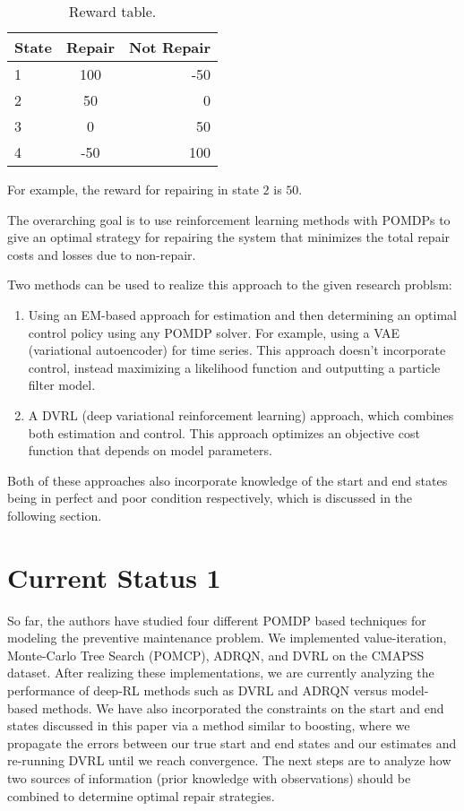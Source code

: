 \documentclass[english]{article}
\numberwithin{equation}{section}
\begin{document}
	 \begin{table}[h!]
	 	\begin{center}
	 		\caption{Reward table.}
	 		\label{tab:table1}
	 		\begin{tabular}{l|c|r} %
	 			\textbf{State} & \textbf{Repair} & \textbf{Not Repair}\\
	 			\hline
	 			1 & 100 & -50\\
	 			2 & 50 & 0\\
	 			3 & 0 & 50\\
	 			4 & -50 & 100
	 		\end{tabular}
	 	\end{center}
	 \end{table}
	 
	 For example, the reward for repairing in state $2$ is $50$.
	
	The overarching goal is to use reinforcement learning methods with POMDPs to give an optimal strategy for repairing the system that minimizes the total repair costs and losses due to non-repair.
	
	Two methods can be used to realize this approach to the given research problsm:
	\begin{enumerate}
		\item Using an EM-based approach for estimation and then determining an optimal control policy using any POMDP solver. For example, using a VAE (variational autoencoder) for time series. This approach doesn't incorporate control, instead maximizing a likelihood function and outputting a particle filter model.
		\item A DVRL (deep variational reinforcement learning) approach, which combines both estimation and control. This approach optimizes an objective cost function that depends on model parameters.
	\end{enumerate}
	
	Both of these approaches also incorporate knowledge of the start and end states being in perfect and poor condition respectively, which is discussed in the following section.
	
	\section*{Current Status 1}
	
	So far, the authors have studied four different POMDP based techniques for modeling the preventive maintenance problem. We implemented value-iteration, Monte-Carlo Tree Search (POMCP), ADRQN, and DVRL on the CMAPSS dataset. After realizing these implementations, we are currently analyzing the performance of deep-RL methods such as DVRL and ADRQN versus model-based methods. We have also incorporated the constraints on the start and end states discussed in this paper via a method similar to boosting, where we propagate the errors between our true start and end states and our estimates and re-running DVRL until we reach convergence. The next steps are to analyze how two sources of information (prior knowledge with observations) should be combined to determine optimal repair strategies.
	
\end{document}
